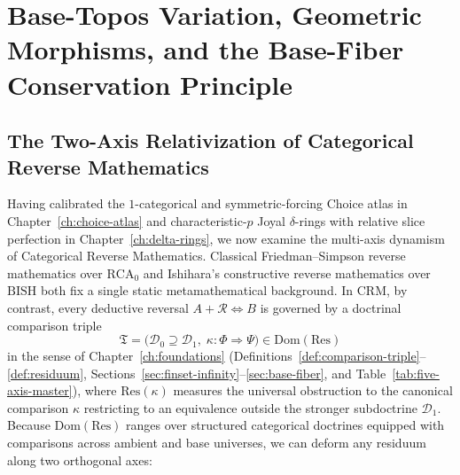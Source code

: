 \chapter{Base-Topos Variation, Geometric Morphisms, and the Base-Fiber Conservation Principle}

\label{ch:base-fiber}

\section{The Two-Axis Relativization of Categorical Reverse Mathematics}\label{sec:two-axis-relativization}

Having calibrated the $1$-categorical and symmetric-forcing Choice atlas in Chapter~\ref{ch:choice-atlas} and characteristic-$p$ Joyal $\delta$-rings with relative slice perfection in Chapter~\ref{ch:delta-rings}, we now examine the multi-axis dynamism of Categorical Reverse Mathematics. Classical Friedman--Simpson reverse mathematics over $\mathrm{RCA}_0$ and Ishihara's constructive reverse mathematics over $\mathrm{BISH}$ both fix a single static metamathematical background. In $\mathrm{CRM}$, by contrast, every deductive reversal $A + \mathcal{R} \iff B$ is governed by a doctrinal comparison triple
\[
  \mathfrak{T} = \bigl(\mathcal{D}_0 \supseteq \mathcal{D}_1,\; \kappa : \Phi \Longrightarrow \Psi\bigr) \in \mathrm{Dom}(\mathrm{Res})
\]
in the sense of Chapter~\ref{ch:foundations} (Definitions~\ref{def:comparison-triple}--\ref{def:residuum}, Sections~\ref{sec:finset-infinity}--\ref{sec:base-fiber}, and Table~\ref{tab:five-axis-master}), where $\mathrm{Res}(\kappa)$ measures the universal obstruction to the canonical comparison $\kappa$ restricting to an equivalence outside the stronger subdoctrine $\mathcal{D}_1$. Because $\mathrm{Dom}(\mathrm{Res})$ ranges over structured categorical doctrines equipped with comparisons across ambient and base universes, we can deform any residuum along two orthogonal axes:

